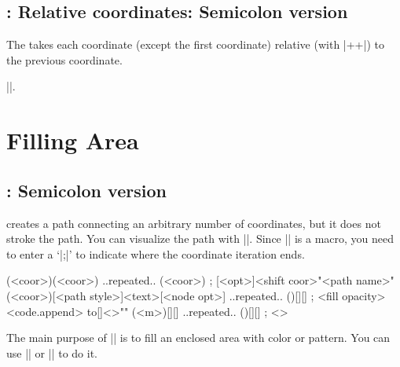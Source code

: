 \section{\protect\cmd{\tztos+}: Relative coordinates: Semicolon version}
\label{s:tztos+}

The  \icmd{\tztos+} takes each coordinate (except the first coordinate) relative (with |++|) to the previous coordinate.

 |\tztos|.

\begin{tzcode}{.3}
\end{tzcode}


\chapter{Filling Area}
\label{c:fillingarea}

\section{\protect\cmd{\tzpath}: Semicolon version}
\label{s:tzpath}


\icmd{\tzpath} creates a path connecting an arbitrary number of coordinates, but it does not stroke the path. You can visualize the path with |\tzpath[draw]|.
Since |\tzpath| is a  macro, you need to enter a  `|;|' to indicate where the coordinate iteration ends.


\begin{tzdef}{}
\tzpath (<coor>)(<coor>) ..repeated.. (<coor>) ;
[<opt>]<shift coor>"<path name>"
       (<coor>)[<path style>]{<text>}[<node opt>] 
       ..repeated.. ()[]{}[] ; {<fill opacity>} <code.append>
  {to}[]<>"" (<m>)[]{}[] ..repeated.. ()[]{}[] ; {}<>
\end{tzdef}

The main purpose of |\tzpath| is to fill an enclosed area with color or pattern.
You can use |\tzpath[fill]| or |\tzpath[pattern=<...>]| to do it.


